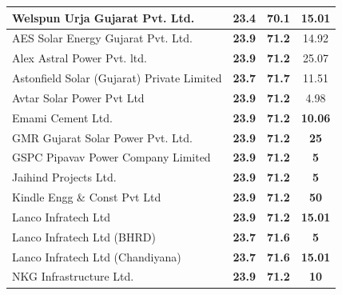 \begin{table}[H]
\begin{tabular}{|l|c|c|c|}
    \hline
    Welspun Urja Gujarat Pvt. Ltd. & \textbf{23.4} & \textbf{70.1} & \textbf{15.01} \bigstrut\\
    \hline
    AES Solar Energy Gujarat Pvt. Ltd. & \textbf{23.9} & \textbf{71.2} & 14.92 \bigstrut\\
    \hline
    Alex Astral Power Pvt. ltd. & \textbf{23.9} & \textbf{71.2} & 25.07 \bigstrut\\
    \hline
    Astonfield Solar (Gujarat) Private Limited  & \textbf{23.7} & \textbf{71.7} & 11.51 \bigstrut\\
    \hline
    Avtar Solar Power Pvt Ltd & \textbf{23.9} & \textbf{71.2} & 4.98 \bigstrut\\
    \hline
    Emami Cement Ltd. & \textbf{23.9} & \textbf{71.2} & \textbf{10.06} \bigstrut\\
    \hline
    GMR Gujarat Solar Power Pvt. Ltd. & \textbf{23.9} & \textbf{71.2} & \textbf{25} \bigstrut\\
    \hline
    GSPC Pipavav Power Company Limited & \textbf{23.9} & \textbf{71.2} & \textbf{5} \bigstrut\\
    \hline
    Jaihind Projects Ltd. & \textbf{23.9} & \textbf{71.2} & \textbf{5} \bigstrut\\
    \hline
    Kindle Engg \& Const Pvt Ltd & \textbf{23.9} & \textbf{71.2} & \textbf{50} \bigstrut\\
    \hline
    Lanco Infratech Ltd & \textbf{23.9} & \textbf{71.2} & \textbf{15.01} \bigstrut\\
    \hline
    Lanco Infratech Ltd (BHRD) & \textbf{23.7} & \textbf{71.6} & \textbf{5} \bigstrut\\
    \hline
    Lanco Infratech Ltd (Chandiyana) & \textbf{23.7} & \textbf{71.6} & \textbf{15.01} \bigstrut\\
    \hline
    NKG Infrastructure Ltd. & \textbf{23.9} & \textbf{71.2} & \textbf{10} \bigstrut\\
    \hline
    \end{tabular}%

    \label{tabc2h1}%

\end{table}

